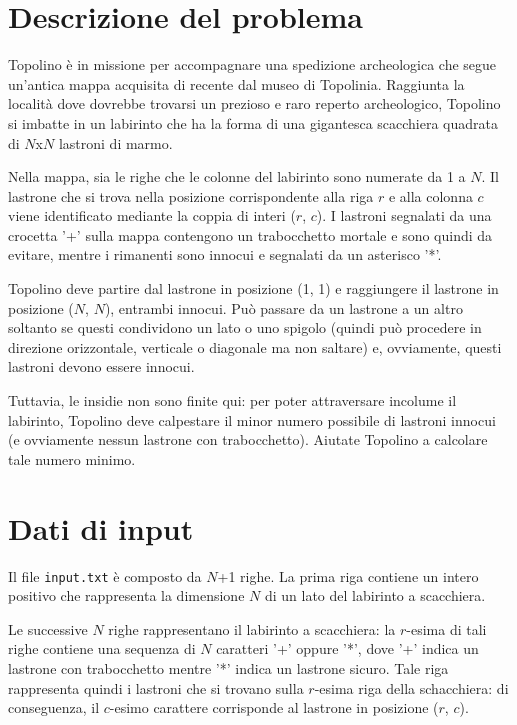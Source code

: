 \documentclass[a4paper,11pt]{article}
\begin{document}
\vspace{0.5cm}



\vspace{0.5cm}

\section*{Descrizione del problema}
   
Topolino è in missione per accompagnare una spedizione
archeologica che segue un'antica mappa acquisita di recente dal museo
di Topolinia. Raggiunta la località dove dovrebbe trovarsi un
prezioso e raro reperto archeologico, Topolino si imbatte in un
labirinto che ha la forma di una gigantesca scacchiera quadrata di
$N$x$N$ lastroni di marmo. 

Nella mappa, sia le righe che le colonne del labirinto sono numerate
da 1 a $N$. Il lastrone che si trova nella posizione
corrispondente alla riga $r$ e alla colonna $c$
viene identificato mediante la coppia di interi ($r$,
$c$). I lastroni segnalati da una crocetta '+' sulla mappa
contengono un trabocchetto mortale e sono quindi da evitare, mentre i
rimanenti sono innocui e segnalati da un asterisco '*'.

Topolino deve partire dal lastrone in posizione (1, 1) e
raggiungere il lastrone in posizione ($N$, $N$),
entrambi innocui. Può passare da un lastrone a un
altro soltanto se questi condividono un lato o uno spigolo (quindi
può procedere in direzione orizzontale, verticale o diagonale
ma non saltare) e, ovviamente, questi lastroni devono essere innocui.

Tuttavia, le insidie non sono finite qui: per poter attraversare
incolume il labirinto, Topolino deve calpestare il minor numero
possibile di lastroni innocui (e ovviamente nessun lastrone con
trabocchetto). Aiutate Topolino a calcolare tale numero minimo.


\section*{Dati di input}
  Il file \texttt{input.txt} è composto da $N$+1
righe.
La prima riga contiene un intero positivo che rappresenta la dimensione
$N$ di un lato del labirinto a scacchiera.

Le successive $N$ righe rappresentano il labirinto a
scacchiera: la $r$-esima di tali righe contiene una sequenza
di $N$ caratteri '+' oppure '*', dove '+' indica un lastrone
con trabocchetto mentre '*' indica un lastrone sicuro. Tale riga
rappresenta quindi i lastroni che si trovano sulla $r$-esima
riga della schacchiera: di conseguenza, il $c$-esimo
carattere corrisponde al lastrone in posizione ($r$, $c$).
\end{document}
